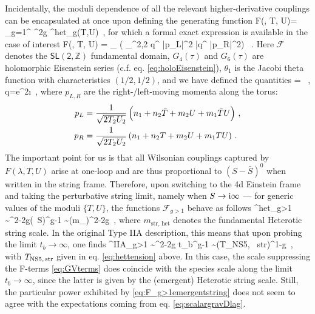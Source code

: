Incidentally, the moduli dependence of all the relevant higher-derivative couplings can be encapsulated at once upon defining the generating function 
%
 \beq
    F(\lambda, T, U)= \sum_{g=1}^{\infty} \lambda^{2g} ^{\rm het}_g(T,U)\, ,
 \eeq
%
for which a formal exact expression is available in the case of interest \cite{Marino:1998pg}
%
\beq
	F(\lambda, T, U) =  \int_{}  \left(  \sum_{\Gamma^{2,2}} q^{ |p_L|^2} \bar{q}^{ |p_R|^2}\right) \, .
\label{eq:Fheteroticoneloop}
\eeq
%
Here $\mathscr{F}$ denotes the $\mathsf{SL(2,\mathbb{Z})}$ fundamental domain, $G_4(\tau)$ and $G_6(\tau)$ are holomorphic Eisenstein series (c.f. eq. \eqref{eq:holoEisenstein}), $\theta_1$ is the Jacobi theta function with characteristics $(1/2,1/2)$, and we have defined the quantities
%
\beq
	\tilde \lambda = \, , \qquad q=e^{2\pi \i \tau}\, ,
\eeq
%
where $p_{L,R}$ are the right-/left-moving momenta along the torus: 
%
\begin{align}
   p_L&= \frac{1}{\sqrt{2T_2U_2}} \left( n_1 +n_2 \bar{T} + m_2 U +m_1 \bar{T}U\right)\, ,\notag \\
   p_R&= \frac{1}{\sqrt{2T_2U_2}} \left( n_1 +n_2 T + m_2 U +m_1 T U\right)\, .
\end{align}
%
The important point for us is that all Wilsonian couplings captured by $F(\lambda, T, U)$ arise at one-loop and are thus proportional to $(S-\bar S)^0$ when written in the string frame. Therefore, upon switching to the 4d Einstein frame and taking the perturbative string limit, namely when $S \to \text{i} \infty$ --- for generic values of the moduli $\{ T,U\}$, the functions $\mathcal{F}_{g>1}$ behave as follows
%
\beq
	^{\rm het}_{g>1} \sim \Mpf^{2-2g}(\, S)^{g-1} \sim \left(m_{}\right)^{2-2g}\, ,
\eeq
%
where $m_{\text{str, het}}$ denotes the fundamental Heterotic string scale. In the original Type IIA description, this means that upon probing the limit $t_b \to \infty$, one finds
%
\beq \label{eq:F_g>1emergentstring}
	^{\rm IIA}_{g>1} \sim \Mpf^{2-2g} t_b^{g-1} \sim (T_{\rm NS5, \, str})^{1-g}\, ,
\eeq
%
with $T_{\rm NS5,\, str}$ given in eq. \eqref{eq:hettension} above. In this case, the scale suppressing the F-terms \eqref{eq:GVterms} does coincide with the species scale along the limit $t_b \to \infty$, since the latter is given by the (emergent) Heterotic string scale. Still, the particular power exhibited by \eqref{eq:F_g>1emergentstring} does not seem to agree with the expectations coming from eq. \eqref{eq:scalargravDlag}.

